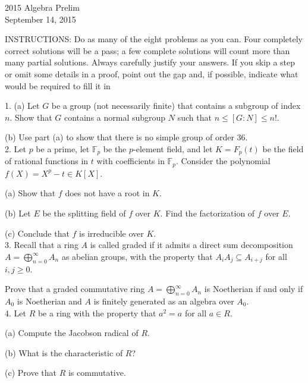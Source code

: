 \documentclass[11pt]{article}
\newcommand{\F}{\mathbb{F}}
\begin{document}
\begin{center}
\Large 2015 Algebra Prelim\\
\normalsize September 14, 2015
\end{center}
\vspace{1em}

INSTRUCTIONS: Do as many of the eight problems as you can. Four completely
correct solutions will be a pass; a few complete solutions will count more than many
partial solutions. Always carefully justify your answers. If you skip a step or omit
some details in a proof, point out the gap and, if possible, indicate what would be
required to fill it in\\
\vspace{1em}


1. (a) Let $G$ be a group (not necessarily finite) that contains a subgroup of index $n$.
Show that $G$ contains a normal subgroup $N$ such that $n \le  [G : N] \le  n!$.

(b) Use part (a) to show that there is no simple group of order 36.\\


2. Let $p$ be a prime, let $\F_p$ be the $p$-element field, and let $K = F_p(t)$ be the field of rational
functions in $t$ with coefficients in $\F_p$. Consider the polynomial $f(X) = X^p - t \in K[X]$.

(a) Show that $f$ does not have a root in $K$.

(b) Let $E$ be the splitting field of $f$ over $K$. Find the factorization of $f$ over $E$.

(c) Conclude that $f$ is irreducible over $K$.\\

3. Recall that a ring $A$ is called graded if it admits a direct sum decomposition $A = \bigoplus_{n=0}^\infty A_n$ as abelian groups, with the property that $A_iA_j \subseteq A_{i+j}$
for all $i, j \ge 0$.

Prove that a graded commutative ring $A = \bigoplus_{n=0}^\infty A_n$ is Noetherian if and only if $A_0$ is
Noetherian and $A$ is finitely generated as an algebra over $A_0$.\\

4. Let $R$ be a ring with the property that $a^2 = a$ for all $a\in R$.

(a) Compute the Jacobson radical of $R$.

(b) What is the characteristic of $R$?

(c) Prove that $R$ is commutative.
\end{document}
